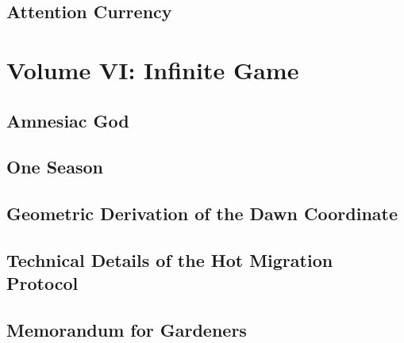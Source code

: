 \documentclass[11pt,a4paper,twoside]{book}
\begin{document}
\chapter{Attention Currency}




\part{Volume VI: Infinite Game}

\chapter{Amnesiac God}




\chapter{One Season}




\appendix

\chapter{Geometric Derivation of the Dawn Coordinate}


\chapter{Technical Details of the Hot Migration Protocol}


\chapter{Memorandum for Gardeners}


\backmatter








\end{document}
